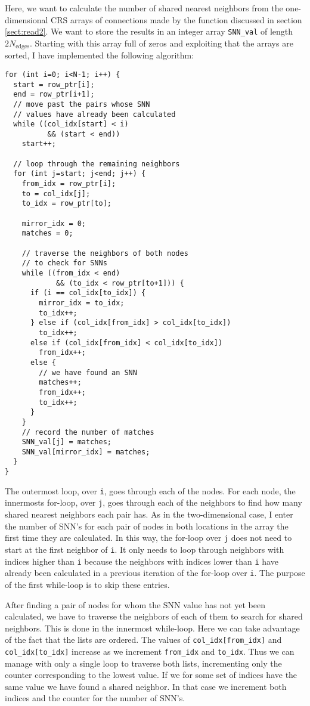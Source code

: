 \documentclass[reprint, english,notitlepage,nofootinbib]{revtex4-1}  %
\begin{document}
Here, we want to calculate the number of shared nearest neighbors from the one-dimensional CRS arrays of connections made by the function discussed in section \ref{sect:read2}. We want to store the results in an integer array \verb|SNN_val| of length \(2 N_{\text{edges}}\). Starting with this array full of zeros and exploiting that the arrays are sorted, I have implemented the following algorithm:
\begin{verbatim}
for (int i=0; i<N-1; i++) {
  start = row_ptr[i];
  end = row_ptr[i+1];
  // move past the pairs whose SNN
  // values have already been calculated
  while ((col_idx[start] < i)
          && (start < end))
    start++;

  // loop through the remaining neighbors
  for (int j=start; j<end; j++) {
    from_idx = row_ptr[i];
    to = col_idx[j];
    to_idx = row_ptr[to];

    mirror_idx = 0;
    matches = 0;

    // traverse the neighbors of both nodes
    // to check for SNNs
    while ((from_idx < end)
            && (to_idx < row_ptr[to+1])) {
      if (i == col_idx[to_idx]) {
        mirror_idx = to_idx;
        to_idx++;
      } else if (col_idx[from_idx] > col_idx[to_idx])
        to_idx++;
      else if (col_idx[from_idx] < col_idx[to_idx])
        from_idx++;
      else {
        // we have found an SNN
        matches++;
        from_idx++;
        to_idx++;
      }
    }
    // record the number of matches
    SNN_val[j] = matches;
    SNN_val[mirror_idx] = matches;
  }
}
\end{verbatim}
The outermost loop, over \verb|i|, goes through each of the nodes. For each node, the innermosts for-loop, over \verb|j|, goes through each of the neighbors to find how many shared nearest neighbors each pair has. As in the two-dimensional case, I enter the number of SNN's for each pair of nodes in both locations in the array the first time they are calculated. In this way, the for-loop over \verb|j| does not need to start at the first neighbor of \verb|i|. It only needs to loop through neighbors with indices higher than \verb|i| because the neighbors with indices lower than \verb|i| have already been calculated in a previous iteration of the for-loop over \verb|i|. The purpose of the first while-loop is to skip these entries.

After finding a pair of nodes for whom the SNN value has not yet been calculated, we have to traverse the neighbors of each of them to search for shared neighbors. This is done in the innermost while-loop. Here we can take advantage of the fact that the lists are ordered. The values of \verb|col_idx[from_idx]| and \verb|col_idx[to_idx]| increase as we increment \verb|from_idx| and \verb|to_idx|. Thus we can manage with only a single loop to traverse both lists, incrementing only the counter corresponding to the lowest value. If we for some set of indices have the same value we have found a shared neighbor. In that case we increment both indices and the counter for the number of SNN's.
\end{document}
